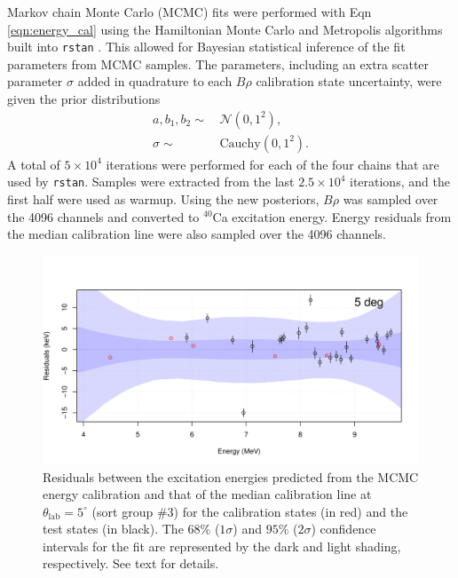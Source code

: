 Markov chain Monte Carlo (MCMC) fits were performed with Eqn \ref{eqn:energy_cal} using the Hamiltonian Monte Carlo and Metropolis algorithms built into \texttt{rstan} \cite{Stan,Rstan}. This allowed for Bayesian statistical inference of the fit parameters from MCMC samples. The parameters, including an extra scatter parameter $\sigma$ added in quadrature to each $B\rho$ calibration state uncertainty, were given the prior distributions
\begin{align}
a, b_{1}, b_{2} \sim& \, \mathcal{N}(0,1^{2}), \nonumber \\
\sigma \sim& \, \mathrm{Cauchy}(0,1^{2}).
\end{align}
A total of $5 \times 10^{4}$ iterations were performed for each of the four chains that are used by \texttt{rstan}. Samples were extracted from the last $2.5 \times 10^{4}$ iterations, and the first half were used as warmup. Using the new posteriors, $B\rho$ was sampled over the 4096 channels and converted to $^{40}$Ca excitation energy. Energy residuals from the median calibration line were also sampled over the 4096 channels.

\begin{figure}[t]
\centering
\includegraphics[width=6.5in]{Chapter-6/figs/residuals-5deg.png}
\caption{\label{fig:residuals_5deg}Residuals between the excitation energies predicted from the MCMC energy calibration and that of the median calibration line at $\theta_{\mathrm{lab}} = 5^{\circ}$ (sort group $\#$3) for the calibration states (in red) and the test states (in black). The $68\%$ ($1\sigma$) and $95\%$ ($2\sigma$) confidence intervals for the fit are represented by the dark and light shading, respectively. See text for details.}
\end{figure}

